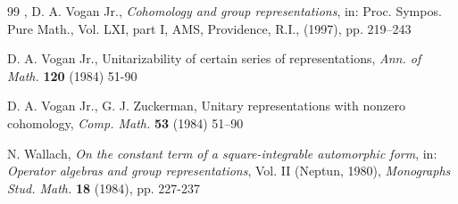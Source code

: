\documentclass[a4paper,10pt]{amsart}
\theoremstyle{definition}
\numberwithin{equation}{section}
\begin{document}
\begin{thebibliography}{99}
, D. A. Vogan Jr., {\it Cohomology and group representations}, in: Proc. Sympos. Pure Math., Vol. LXI, part I, AMS, Providence, R.I., (1997), pp. 219--243

 D. A. Vogan Jr., Unitarizability of certain series of representations, {\it Ann. of Math.} {\bf 120} (1984) 51-90


 D. A. Vogan Jr., G. J. Zuckerman, Unitary representations with nonzero cohomology, {\it Comp. Math.} \textbf{53} (1984) 51--90


 N. Wallach, {\it On the constant term of a square-integrable automorphic form}, in: {\it Operator algebras and group representations}, Vol. II (Neptun, 1980), {\it Monographs Stud. Math.} \textbf{18} (1984), pp. 227-237


\end{thebibliography}
\end{document}
